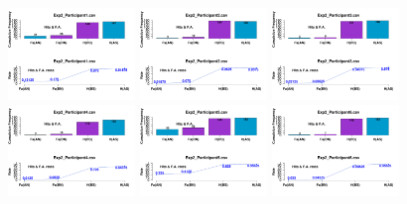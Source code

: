 \begin{figure}[th]
\centering
\includegraphics[width=0.30\textwidth]{Figures/MirrorRate_Exp2_P1} \includegraphics[width=0.30\textwidth]{Figures/MirrorRate_Exp2_P2} \includegraphics[width=0.30\textwidth]{Figures/MirrorRate_Exp2_P3}
\includegraphics[width=0.30\textwidth]{Figures/MirrorRate_Exp2_P4} \includegraphics[width=0.30\textwidth]{Figures/MirrorRate_Exp2_P5} \includegraphics[width=0.30\textwidth]{Figures/MirrorRate_Exp2_P6}

\end{figure}
